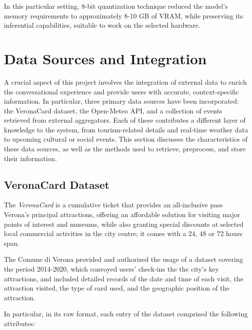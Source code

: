 In this particular setting, 8-bit quantization technique reduced the model’s memory requirements to approximately 8-10 GB of VRAM, while preserving its inferential capabilities, suitable to work on the selected hardware.




\section{Data Sources and Integration}
\label{sec:data-sources}

A crucial aspect of this project involves the integration of external data to enrich the conversational experience and provide users with accurate, context-specific information. In particular, three primary data sources have been incorporated: the VeronaCard dataset, the Open-Meteo API, and a collection of events retrieved from external aggregators. Each of these contributes a different layer of knowledge to the system, from tourism-related details and real-time weather data to upcoming cultural or social events. This section discusses the characteristics of these data sources, as well as the methods used to retrieve, preprocess, and store their information.


\subsection{VeronaCard Dataset}
\label{sec:veronacard}

The \textit{VeronaCard} is a cumulative ticket that provides an all-inclusive pass Verona's principal attractions, offering an affordable solution for visiting major points of interest and museums, while also granting special discounts at selected local commercial activities in the city centre; it comes with a 24, 48 or 72 hours span.

The Comune di Verona provided and authorized the usage of a dataset covering the period 2014-2020, which convoyed users' check-ins the the city's key attractions, and included detailed records of the date and time of each visit, the attraction visited, the type of card used, and the geographic position of the attraction.

In particular, in its raw format, each entry of the dataset comprised the following attributes:

